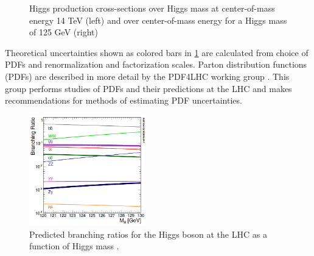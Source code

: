 \begin{figure}[H]
    \centering
    \qquad
    \caption{Higgs production cross-sections over Higgs mass at center-of-mass energy 14 TeV (left) and over center-of-mass energy for a Higgs mass of 125 GeV  (right)\cite{LHCCrossSectionWG}}%
    \label{fig:HiggsCrosssection}%
\end{figure}

Theoretical uncertainties shown as colored bars in \ref{fig:HiggsCrosssection} are calculated from choice of PDFs and renormalization and factorization scales. Parton distribution functions (PDFs) are described in more detail by the PDF4LHC working group \cite{PDF4LHC15}. This group performs studies of PDFs and their predictions at the LHC and makes recommendations for methods of estimating PDF uncertainties. 

\begin{figure}[H]
        \centering
    \includegraphics[width=0.45\textwidth] {Pictures/HiggsBranching.png}\hspace{1cm}
    \caption{Predicted branching ratios for the Higgs boson at the LHC as a function of Higgs mass \cite{LHCCrossSectionWG}.}
    \label{fig:HiggsBR}
\end{figure}

